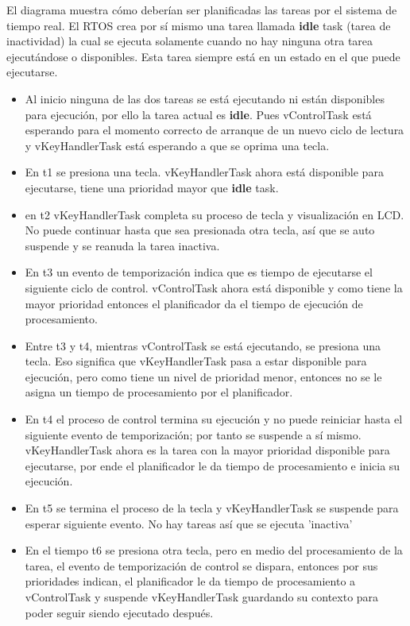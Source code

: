 El diagrama muestra cómo deberían ser planificadas las tareas por el sistema de tiempo real. El RTOS crea por sí mismo una tarea llamada \textbf{idle} task (tarea de inactividad) la cual se ejecuta solamente cuando no hay ninguna otra tarea ejecutándose o disponibles. Esta tarea siempre está en un estado en el que puede ejecutarse. \\

\begin{itemize}
    \item Al inicio ninguna de las dos tareas se está ejecutando ni están disponibles para ejecución, por ello la tarea actual es \textbf{idle}. Pues vControlTask está esperando para el momento correcto de arranque de un nuevo ciclo de lectura y vKeyHandlerTask está esperando a que se oprima una tecla.
    \item En t1 se presiona una tecla. vKeyHandlerTask ahora está disponible para ejecutarse, tiene una prioridad mayor que \textbf{idle} task. 
    \item en t2 vKeyHandlerTask completa su proceso de tecla y visualización en LCD. No puede continuar hasta que sea presionada otra tecla, así que se auto suspende y se reanuda la tarea inactiva. 
    \item En t3 un evento de temporización indica que es tiempo de ejecutarse el siguiente ciclo de control. vControlTask ahora está disponible y como tiene la mayor prioridad entonces el planificador da el tiempo de ejecución de procesamiento.
    \item Entre t3 y t4, mientras vControlTask se está ejecutando, se presiona una tecla. Eso significa que vKeyHandlerTask pasa a estar disponible para ejecución, pero como tiene un nivel de prioridad menor, entonces no se le asigna un tiempo de procesamiento por el planificador.
    \item En t4 el proceso de control termina su ejecución y no puede reiniciar hasta el siguiente evento de temporización; por tanto se suspende a sí mismo. vKeyHandlerTask ahora es la tarea con la mayor prioridad disponible para ejecutarse, por ende el planificador le da tiempo de procesamiento e inicia su ejecución. 
    \item En t5 se termina el proceso de la tecla y vKeyHandlerTask se suspende para esperar siguiente evento. No hay tareas así que se ejecuta 'inactiva'
    \item En el tiempo t6 se presiona otra tecla, pero en medio del procesamiento de la tarea, el evento de temporización de control se dispara, entonces por sus prioridades indican, el planificador le da tiempo de procesamiento a vControlTask y suspende vKeyHandlerTask guardando su contexto para poder seguir siendo ejecutado después.
\end{itemize}

